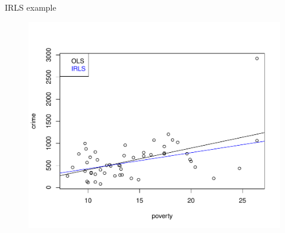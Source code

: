\documentclass{beamer}
\begin{document}
\begin{frame}{IRLS example}
\begin{figure}
    \centering
    \includegraphics[width=.9\textwidth]{plots/ols_irls.pdf}
\end{figure}
\end{frame}
\end{document}
